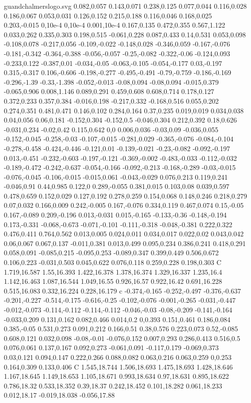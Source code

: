 \begin{filecontents}[noheader]{guandchalmerslogo.svg}
0.082,0.057 0.143,0.071 0.238,0.125 0.077,0.044 0.116,0.028 0.186,0.067 0.053,0.031 0.126,0.152 0.215,0.188 0.116,0.046 0.168,0.025 0.203,-0.015 0,10e-4 0,10e-4 0.001,10e-4 0.167,0.135 0.472,0.355 0.567,1.122 0.033,0.262 0.335,0.303 0.198,0.515 -0.061,0.228 0.087,0.433 0.14,0.531 0.053,0.098 -0.108,0.078 -0.217,0.056 -0.109,-0.022 -0.148,0.028 -0.346,0.059 -0.167,-0.076 -0.181,-0.342 -0.364,-0.388 -0.056,-0.057 -0.25,-0.082 -0.322,-0.06 -0.124,0.093 -0.233,0.122 -0.387,0.01 -0.034,-0.05 -0.063,-0.105 -0.054,-0.177 0.03,-0.197 0.315,-0.317 0.106,-0.606 -0.198,-0.277 -0.495,-0.491 -0.79,-0.759 -0.186,-0.169 -0.296,-1.39 -0.33,-1.398 -0.052,-0.013 -0.08,0.094 -0.08,0.094 -0.015,0.379 -0.065,0.906 0.008,1.146 0.089,0.291 0.459,0.608 0.608,0.714 0.178,0.127 0.372,0.233 0.357,0.384 -0.016,0.198 -0.217,0.332 -0.168,0.516 0.055,0.202 0.274,0.351 0.481,0.471 0.146,0.102 0.284,0.164 0.37,0.235 0.019,0.019 0.034,0.038 0.04,0.056 0.06,0.181 -0.152,0.304 -0.152,0.5 -0.046,0.304 0.212,0.392 0.18,0.626 -0.031,0.234 -0.02,0.42 0.115,0.642 0,0 0.006,0.036 -0.03,0.09 -0.036,0.055 -0.152,-0.045 -0.258,-0.03 -0.107,-0.015 -0.281,0.029 -0.365,-0.076 -0.084,-0.104 -0.278,-0.458 -0.424,-0.446 -0.121,0.01 -0.139,-0.021 -0.23,-0.082 -0.092,-0.197 0.013,-0.451 -0.232,-0.603 -0.197,-0.121 -0.369,-0.002 -0.483,-0.033 -0.112,-0.032 -0.189,-0.472 -0.242,-0.637 -0.054,-0.166 -0.092,-0.213 -0.168,-0.289 -0.03,-0.015 -0.076,-0.045 -0.106,-0.015 -0.015,0.061 -0.043,-0.029 0.076,0.213 0.119,0.241 -0.046,0.91 0.44,0.985 0.122,0 0.289,-0.055 0.381,0.015 0.103,0.08 0.039,0.597 0.478,0.659 0.152,0.029 0.127,0.192 0.278,0.259 0.154,0.068 0.148,0.246 0.218,0.279 0.07,0.032 0.166,0.009 0.242,-0.005 0.167,-0.076 0.334,0.119 0.467,0.074 0.15,-0.05 0.167,-0.089 0.209,-0.196 0.013,-0.031 0.015,-0.165 -0.133,-0.36 -0.148,-0.194 0.173,-0.331 -0.068,-0.673 -0.071,-0.101 -0.111,-0.318 -0.048,-0.381 0.222,0.322 0.476,0.411 0.764,0.562 0.013,0.005 0.024,0.011 0.034,0.017 0.022,0.02 0.043,0.042 0.06,0.067 0.067,0.137 -0.011,0.381 0.013,0.499 0.095,0.234 0.386,0.241 0.418,0.291 0.058,0.091 -0.085,0.215 -0.095,0.253 -0.089,0.347 0.399,0.449 0.506,0.672 0.106,0.223 -0.031,0.503 0.045,0.622 0.076,0.118 0.259,0.228 0.198,0.303 C 1.719,16.587 1.55,16.393 1.422,16.378 1.378,16.374 1.329,16.337 1.235,16.4 1.142,16.463 1.087,16.544 1.049,16.55 0.926,16.57 0.922,16.42 0.691,16.228 0.515,16.083 0.332,16.224 0.228,16.179 c -0.374,-0.165 -0.252,-0.497 -0.376,-0.637 -0.201,-0.227 -0.514,-0.175 -0.616,-0.25 -0.102,-0.076 -0.001,-0.265 -0.031,-0.447 -0.012,-0.073 -0.114,-0.112 -0.114,-0.112 -0.046,-0.03 -0.08,-0.209 -0.141,-0.164 -0.033,0.209 0.131,0.162 0.082,0.466 0.014,0.2 0,0.393 0.151,0.461 0.186,0.084 0.385,-0.05 0.531,0.273 0.091,0.212 0.166,0.51 0.38,0.576 0.223,0.073 0.52,-0.085 0.608,0.121 0.032,0.098 -0.08,-0.01 -0.076,0.152 0.007,0.293 0.286,0.413 0.516,0.5 0.076,0.061 0.137,0.167 0.092,0.273 -0.061,0.091 -0.117,0.179 -0.069,0.373 0.03,0.121 0.094,0.147 0.222,0.266 0.088,0.082 0.063,0.216 0.063,0.259 0,0.253 0.164,0.309 0.133,0.406 C 1.545,18.744 1.506,18.693 1.475,18.693 1.428,18.646 1.167,18.645 1.149,18.653 1.105,18.671 0.993,18.634 0.97,18.631 0.895,18.622 0.786,18.32 0.533,18.352 0.39,18.37 0.242,18.452 0.101,18.282 0.061,18.233 0.012,18.17 -0.019,18.038 -0.056,17.88 
\end{filecontents}
